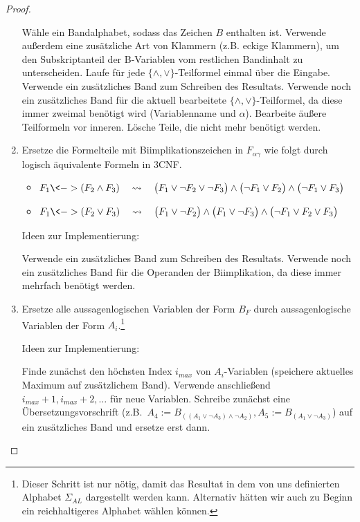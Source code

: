 \begin{proof}
\begin{enumerate}
  Wähle ein Bandalphabet, sodass das Zeichen $B$ enthalten ist.
  Verwende außerdem eine zusätzliche Art von Klammern (z.B. eckige Klammern), um den Subskriptanteil der B-Variablen vom restlichen Bandinhalt zu unterscheiden.
  Laufe für jede $\{\land,\lor\}$-Teilformel einmal über die Eingabe.
  Verwende ein zusätzliches Band zum Schreiben des Resultats.
  Verwende noch ein zusätzliches Band für die aktuell bearbeitete $\{\land,\lor\}$-Teilformel, da diese immer zweimal benötigt wird (Variablenname und $\alpha$).
  Bearbeite äußere Teilformeln vor inneren.
  Lösche Teile, die nicht mehr benötigt werden.
\item Ersetze die Formelteile mit Biimplikationszeichen in $F_{\alpha\gamma}$ wie folgt durch logisch äquivalente Formeln in 3CNF.
	\begin{itemize}
	\item $F_1\<-> (F_2\land F_3)
		\quad\rightsquigarrow\quad \big(F_1\lor \neg F_2\lor \neg F_3\big)\land \big(\neg F_1\lor F_2\big)\land \big(\neg F_1\lor F_3\big)
		$
	\item $F_1\<-> (F_2\lor F_3)
		\quad\rightsquigarrow\quad \big(F_1\lor \neg F_2\big)\land\big(F_1\lor \neg F_3\big)\land \big(\neg F_1\lor F_2\lor F_3\big)
$
	\end{itemize}
	
	Ideen zur Implementierung:
	
	Verwende ein zusätzliches Band zum Schreiben des Resultats.
	Verwende noch ein zusätzliches Band für die Operanden der Biimplikation, da diese immer mehrfach benötigt werden.
  
\item Ersetze alle aussagenlogischen Variablen der Form $B_F$ durch aussagenlogische Variablen der Form $A_i$.\footnote{%
Dieser Schritt ist nur nötig, damit das Resultat in dem von uns definierten Alphabet $\Sigma_{AL}$ dargestellt werden kann.
Alternativ hätten wir auch zu Beginn ein reichhaltigeres Alphabet wählen können.
}

	Ideen zur Implementierung:
	
    Finde zunächst den höchsten Index $i_{max}$ von $A_i$-Variablen (speichere aktuelles Maximum auf zusätzlichem Band).
    Verwende anschließend $i_{max}+1, i_{max}+2, \ldots$ für neue Variablen.
    Schreibe zunächst eine Übersetzungsvorschrift (z.B.\ $A_4:=B_{((A_1\lor \neg A_3)\land \neg A_2)}, A_5:=B_{(A_1\lor \neg A_3)}$) auf ein zusätzliches Band und ersetze erst dann.


\end{enumerate}
\end{proof}

